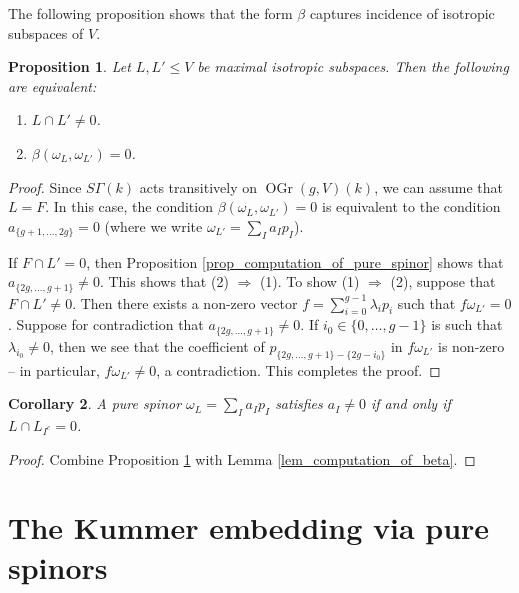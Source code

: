 \documentclass{article} %
\newtheorem{proposition}{Proposition}[section]
\newtheorem{corollary}[proposition]{Corollary}
\numberwithin{equation}{section}
\DeclareMathOperator{\OGr}{OGr}
\begin{document}
The following proposition shows that the form $\beta$ captures incidence of isotropic subspaces of $V$. 
\begin{proposition}\label{prop_incidence_in_terms_of_beta}
    Let $L, L' \leq V$ be maximal isotropic subspaces. Then the following are equivalent:
    \begin{enumerate}
        \item $L \cap L' \neq 0$.
        \item $\beta(\omega_L, \omega_{L'}) = 0$.
    \end{enumerate}
\end{proposition}
\begin{proof}
    Since $S\Gamma(k)$ acts transitively on $\OGr(g, V)(k)$, we can assume that $L = F$. In this case, the condition $\beta(\omega_L, \omega_{L'}) = 0$ is equivalent to the condition $a_{\{g+1, \dots, 2g\}} = 0$ (where we write $\omega_{L'} = \sum_I a_I p_I$). 

    If $F \cap L' = 0$, then Proposition \ref{prop_computation_of_pure_spinor} shows that $a_{\{ 2g, \dots, g+1 \}} \neq 0$. This shows that (2) $\Rightarrow$ (1). To show (1) $\Rightarrow$ (2), suppose that $F \cap L' \neq 0$. Then there exists a non-zero vector $f = \sum_{i=0}^{g-1} \lambda_i p_i$ such that $f \omega_{L'} = 0$. Suppose for contradiction that $a_{\{ 2g, \dots, g+1 \}} \neq 0$. If $i_0 \in \{ 0, \dots, g-1 \}$  is such that $\lambda_{i_0} \neq 0$, then we see that the coefficient of $p_{\{2g, \dots, g+1\} - \{ 2g-i_0 \}}$ in $f \omega_{L'}$ is non-zero -- in particular, $f \omega_{L'} \neq 0$, a contradiction. This completes the proof. 
\end{proof}

\begin{corollary}\label{corollary_nonvanishingcoeff_LI}
    A pure spinor $\omega_L = \sum_I a_I p_I$ satisfies $a_I \neq 0$ if and only if $L \cap L_{I^c} = 0$.
\end{corollary}
\begin{proof}
    Combine Proposition \ref{prop_incidence_in_terms_of_beta} with Lemma \ref{lem_computation_of_beta}.
\end{proof}


\section{The Kummer embedding via pure spinors}\label{sec_hyperelliptic_curves_and_kummers}
\end{document}
